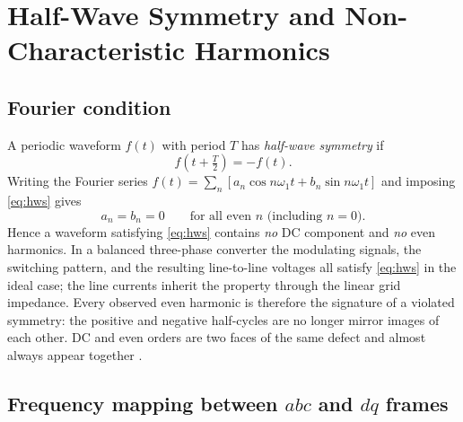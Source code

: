 \documentclass[11pt,a4paper]{article}
\newcommand{\dq}{\ensuremath{dq}}
\begin{document}
\section{Half-Wave Symmetry and Non-Characteristic Harmonics}

\subsection{Fourier condition}

A periodic waveform $f(t)$ with period $T$ has \emph{half-wave symmetry} if
%
\begin{equation}
f\!\left(t + \tfrac{T}{2}\right) = -f(t).
\label{eq:hws}
\end{equation}
%
Writing the Fourier series $f(t) = \sum_n \left[a_n \cos n\omega_1 t
+ b_n \sin n\omega_1 t\right]$ and imposing \eqref{eq:hws} gives
%
\begin{equation}
a_n = b_n = 0 \qquad \text{for all even } n \text{ (including } n=0\text{)}.
\end{equation}
%
Hence a waveform satisfying \eqref{eq:hws} contains \emph{no} DC component and
\emph{no} even harmonics. In a balanced three-phase converter the modulating
signals, the switching pattern, and the resulting line-to-line voltages all
satisfy \eqref{eq:hws} in the ideal case; the line currents inherit the
property through the linear grid impedance. Every observed even harmonic is
therefore the signature of a violated symmetry: the positive and negative
half-cycles are no longer mirror images of each other. DC and even orders are
two faces of the same defect and almost always appear together
\cite{arrillaga,wakileh}.

\subsection{Frequency mapping between \texorpdfstring{$abc$}{abc} and
\texorpdfstring{\dq}{dq} frames}
\end{document}
